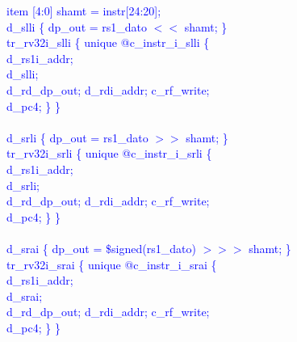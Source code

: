 \textcolor{blue}{
\indent item [4:0] shamt = instr[24:20];\\%
\indent d\_slli \{ dp\_out = rs1\_dato $<<$ shamt; \}\\%
\indent tr\_rv32i\_slli \{ unique @c\_instr\_i\_slli \{ \\%
\indent \hspace{\parindent} d\_rs1i\_addr; \\%
\indent \hspace{\parindent} d\_slli; \\%
\indent \hspace{\parindent} d\_rd\_dp\_out; d\_rdi\_addr; c\_rf\_write;  \\%
\indent \hspace{\parindent} d\_pc4; \} \} \\%
\\
\indent d\_srli \{ dp\_out = rs1\_dato $>>$ shamt; \}\\%
\indent tr\_rv32i\_srli \{ unique @c\_instr\_i\_srli \{ \\%
\indent \hspace{\parindent} d\_rs1i\_addr; \\%
\indent \hspace{\parindent} d\_srli; \\%
\indent \hspace{\parindent} d\_rd\_dp\_out; d\_rdi\_addr; c\_rf\_write;  \\%
\indent \hspace{\parindent} d\_pc4; \} \} \\%
\\
\indent d\_srai \{ dp\_out = \$signed(rs1\_dato) $>>>$ shamt; \}\\%
\indent tr\_rv32i\_srai \{ unique @c\_instr\_i\_srai \{ \\%
\indent \hspace{\parindent} d\_rs1i\_addr; \\%
\indent \hspace{\parindent} d\_srai; \\%
\indent \hspace{\parindent} d\_rd\_dp\_out; d\_rdi\_addr; c\_rf\_write;  \\%
\indent \hspace{\parindent} d\_pc4; \} \} \\%
}


